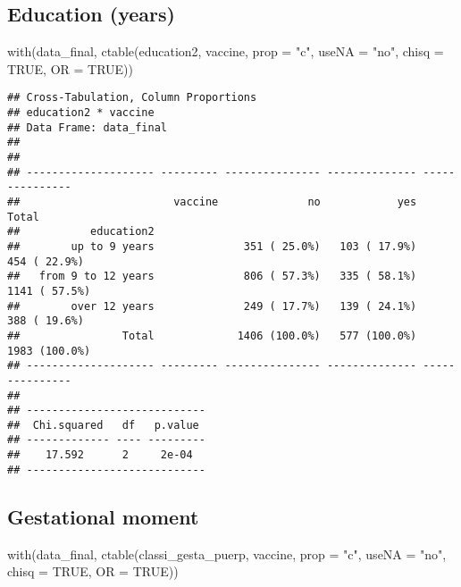 \documentclass[
]{article}
\newenvironment{Shaded}{\begin{snugshade}}{\end{snugshade}}
\newcommand{\AttributeTok}[1]{\textcolor[rgb]{0.77,0.63,0.00}{#1}}
\newcommand{\ConstantTok}[1]{\textcolor[rgb]{0.00,0.00,0.00}{#1}}
\newcommand{\FunctionTok}[1]{\textcolor[rgb]{0.00,0.00,0.00}{#1}}
\newcommand{\NormalTok}[1]{#1}
\newcommand{\StringTok}[1]{\textcolor[rgb]{0.31,0.60,0.02}{#1}}
\begin{document}
\hypertarget{education-years}{%
\subsection{Education (years)}\label{education-years}}

\begin{Shaded}
\begin{Highlighting}[]
\FunctionTok{with}\NormalTok{(data\_final, }\FunctionTok{ctable}\NormalTok{(education2, vaccine, }\AttributeTok{prop =} \StringTok{"c"}\NormalTok{, }\AttributeTok{useNA =} \StringTok{"no"}\NormalTok{, }\AttributeTok{chisq =} \ConstantTok{TRUE}\NormalTok{, }\AttributeTok{OR =} \ConstantTok{TRUE}\NormalTok{))}
\end{Highlighting}
\end{Shaded}

\begin{verbatim}
## Cross-Tabulation, Column Proportions  
## education2 * vaccine  
## Data Frame: data_final  
## 
## 
## -------------------- --------- --------------- -------------- ---------------
##                        vaccine              no            yes           Total
##           education2                                                         
##        up to 9 years              351 ( 25.0%)   103 ( 17.9%)    454 ( 22.9%)
##   from 9 to 12 years              806 ( 57.3%)   335 ( 58.1%)   1141 ( 57.5%)
##        over 12 years              249 ( 17.7%)   139 ( 24.1%)    388 ( 19.6%)
##                Total             1406 (100.0%)   577 (100.0%)   1983 (100.0%)
## -------------------- --------- --------------- -------------- ---------------
## 
## ----------------------------
##  Chi.squared   df   p.value 
## ------------- ---- ---------
##    17.592      2     2e-04  
## ----------------------------
\end{verbatim}

\hypertarget{gestational-moment}{%
\subsection{Gestational moment}\label{gestational-moment}}

\begin{Shaded}
\begin{Highlighting}[]
\FunctionTok{with}\NormalTok{(data\_final, }\FunctionTok{ctable}\NormalTok{(classi\_gesta\_puerp, vaccine, }\AttributeTok{prop =} \StringTok{"c"}\NormalTok{, }\AttributeTok{useNA =} \StringTok{"no"}\NormalTok{, }\AttributeTok{chisq =} \ConstantTok{TRUE}\NormalTok{, }\AttributeTok{OR =} \ConstantTok{TRUE}\NormalTok{))}
\end{Highlighting}
\end{Shaded}
\end{document}
